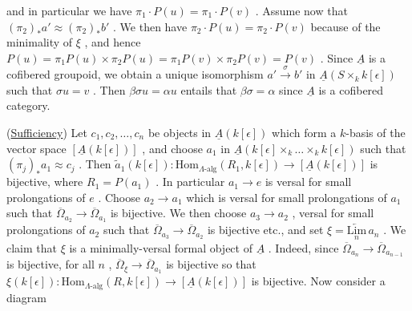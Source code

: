 \begin{center}
\end{center}
and in particular we have $\pi_1\cdot P(u) = \pi_1\cdot P(v)$ . Assume now that $(\pi_2)_*a' \approx (\pi_2)_*b'$ . We then have $\pi_2\cdot P(u) = \pi_2\cdot P(v)$ because of the minimality of
$\xi$ , and hence  $P(u) = \pi_1 P(u)\times \pi_2 P(u) = \pi_1 P(v)\times \pi_2 P(v) = P(v)$  . Since  $\underline{A}$  is a cofibered groupoid, we obtain a unique isomorphism  $a' \overset{\sigma}{\to} b'$  in $\underline{A}(S\times_k k[\epsilon])$  such that  $\sigma u = v$  . Then  $\beta\sigma u = \alpha u$  entails that  $\beta\sigma= \alpha$  since  $\underline{A}$ is a cofibered category.

(\underline{Sufficiency}) Let  $c_1,c_2,\dots,c_n$  be objects in  $\underline{A}(k[\epsilon])$  which form a $k$-basis of the vector space  $[\underline{A}(k[\epsilon])]$  , and choose  $a_1$  in  $\underline{A}(k[\epsilon]\times_k\dots\times_k k[\epsilon])$ such that  $(\pi_j)_* a_1 \approx c_j$  . Then  $\tilde{a}_1(k[\epsilon]) : \mathrm{Hom}_{\Lambda\text{-alg}}(R_1,k[\epsilon]) \to [\underline{A}(k[\epsilon])]$  is bijective, where  $R_1 = P(a_1)$  . In particular  $a_1 \to e$  is versal for small prolongations of  $e$  . Choose  $a_2 \to a_1$  which is versal for small prolongations of  $a_1$ such that  $\overline{\Omega}_{a_2} \to \overline{\Omega}_{a_1}$  is bijective. We then choose  $a_3 \to a_2$  , versal for small prolongations of  $a_2$  such that  $\overline{\Omega}_{a_3} \to \overline{\Omega}_{a_2}$  is bijective etc., and set $\xi = \underset{n}{\underleftarrow{\mathrm{Lim}}}\, a_n$  . We claim that  $\xi$  is a minimally-versal formal object of  $\underline{A}$  . Indeed, since  $\overline{\Omega}_{a_n} \to \overline{\Omega}_{a_{n-1}}$  is bijective, for all  $n$  ,  $\overline{\Omega}_{\xi} \to \overline{\Omega}_{a_1}$  is bijective so that $\xi(k[\epsilon]) : \mathrm{Hom}_{\Lambda\text{-alg}}(R,k[\epsilon]) \to [\underline{A}(k[\epsilon])]$  is bijective. Now consider a diagram

